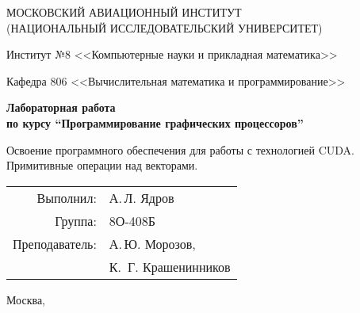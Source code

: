 \begin{titlepage}
\begin{center}
\large
МОСКОВСКИЙ АВИАЦИОННЫЙ ИНСТИТУТ\\ (НАЦИОНАЛЬНЫЙ ИССЛЕДОВАТЕЛЬСКИЙ УНИВЕРСИТЕТ)

\vspace{20pt}

Институт №8 <<Компьютерные науки и прикладная математика>>

Кафедра 806 <<Вычислительная математика и программирование>>
\end{center}

\vspace{60pt}

\begin{center}
\bfseries
\large
Лабораторная работа  \\по курсу \enquote{Программирование графических процессоров}

\vspace{54pt}

Освоение программного обеспечения для работы с технологией CUDA.\\
Примитивные операции над векторами.
\end{center}

\vfill

\begin{flushright}
\large
\begin{tabular}{rl}
Выполнил: & А.\,Л. Ядров \\
Группа: & 8О-408Б \\
Преподаватель: & А.\,Ю. Морозов, \\
& К.\, Г. Крашенинников
\end{tabular}
\end{flushright}

\vspace{92pt}

\begin{center}
\large
Москва, \the\year
\end{center}
\end{titlepage}

\pagebreak

